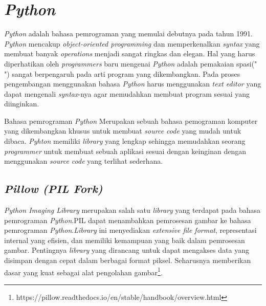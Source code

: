\section{\textit{Python}}
\label{sec:python}
\textit{Python} adalah bahasa pemrograman yang memulai debutnya pada tahun 1991. \textit{Python} mencakup \textit{object-oriented programming} dan memperkenalkan \textit{syntax} yang membuat banyak \textit{operations} menjadi sangat ringkas dan elegan. Hal yang harus diperhatikan oleh \textit{programmers} baru mengenai \textit{Python} adalah pemakaian spasi(" ") sangat berpengaruh pada arti program yang dikembangkan. Pada proses pengembangan menggunakan bahasa \textit{Python} harus menggunakan \textit{text editor} yang dapat mengenali \textit{syntax}-nya agar memudahkan membuat program sesuai yang diinginkan.\cite{john:22:data}

Bahasa pemrograman \textit{Python} Merupakan sebuah bahasa pemograman komputer yang dikembangkan khusus untuk membuat \textit{source code} yang mudah untuk dibaca. \textit{Pyhton} memiliki \textit{library} yang lengkap sehingga memudahkan seorang \textit{programmer} untuk membuat sebuah aplikasi sesuai dengan keinginan dengan menggunakan \textit{source code} yang terlihat sederhana.

\subsection{\textit{Pillow (PIL Fork)}}
\label{subsec:python PIL}
\textit{Python Imaging Library} merupakan salah satu \textit{library} yang terdapat pada bahasa pemrograman \textit{Python}.PIL dapat menambahkan pemrosesan gambar ke bahasa pemrograman \textit{Python}.\textit{Library} ini menyediakan \textit{extensive file format}, representasi internal yang efisien, dan memiliki kemampuan yang baik dalam pemrosesan gambar. Pentingnya \textit{library} yang dirancang untuk dapat mengakses data yang disimpan dengan cepat dalam berbagai format piksel. Seharusnya memberikan dasar yang kuat sebagai alat pengolahan gambar\footnote{https://pillow.readthedocs.io/en/stable/handbook/overview.html}.

